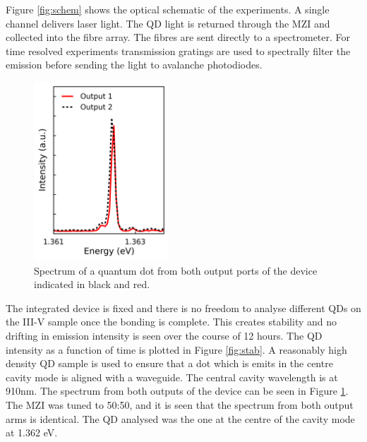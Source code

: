 Figure \ref{fig:schem} shows the optical schematic of the experiments. A single
channel delivers laser light. The QD light is returned through the MZI and
collected into the fibre array. The fibres are sent directly to a spectrometer.
For time resolved experiments transmission gratings are used to spectrally
filter the emission before sending the light to avalanche photodiodes.

\begin{figure}[h!] \begin{center}
\includegraphics[width=0.45\textwidth]{images/spec.png} \caption{Spectrum of a
quantum dot from both output ports of the device indicated in black and red.} \label{fig:spec} \end{center} \end{figure}

The integrated device is fixed and there is no freedom to analyse different QDs
on the III-V sample once the bonding is complete. This creates stability and no
drifting in emission intensity is seen over the course of 12 hours. The QD
intensity as a function of time is plotted in Figure \ref{fig:stab}. A
reasonably high density QD sample is used to ensure that a dot which is emits in
the centre cavity mode is aligned with a waveguide. The central cavity
wavelength is at 910nm. The spectrum from both outputs of the device can be seen
in Figure \ref{fig:spec}. The MZI was tuned to 50:50, and it is seen that the
spectrum from both output arms is identical. The QD analysed was the one at the
centre of the cavity mode at 1.362 eV.

